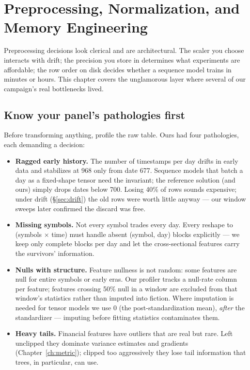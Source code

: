 \chapter[Preprocessing and Memory Engineering]{Preprocessing, Normalization, and Memory Engineering}
\label{ch:preprocessing}

Preprocessing decisions look clerical and are architectural. The scaler you
choose interacts with drift; the precision you store in determines what
experiments are affordable; the row order on disk decides whether a sequence
model trains in minutes or hours. This chapter covers the unglamorous layer
where several of our campaign's real bottlenecks lived.

\section{Know your panel's pathologies first}

Before transforming anything, profile the raw table. Ours had four
pathologies, each demanding a decision:

\begin{itemize}
\item \textbf{Ragged early history.} The number of timestamps per day drifts
  in early data and stabilizes at 968 only from date 677. Sequence models
  that batch a day as a fixed-shape tensor need the invariant; the reference
  solution (and ours) simply drops dates below 700. Losing 40\% of rows
  sounds expensive; under drift (\S\ref{sec:drift}) the old rows were
  worth little anyway --- our window sweeps later confirmed the discard was
  free.
\item \textbf{Missing symbols.} Not every symbol trades every day. Every
  reshape to (symbols $\times$ time) must handle absent (symbol, day)
  blocks explicitly --- we keep only complete blocks per day and let the
  cross-sectional features carry the survivors' information.
\item \textbf{Nulls with structure.} Feature nullness is not random: some
  features are null for entire symbols or early eras. Our profiler tracks
  a null-rate column per feature; features crossing 50\% null in a window
  are excluded from that window's statistics rather than imputed into
  fiction. Where imputation is needed for tensor models we use 0 (the
  post-standardization mean), \emph{after} the standardizer --- imputing
  before fitting statistics contaminates them.
\item \textbf{Heavy tails.} Financial features have outliers that are real
  but rare. Left unclipped they dominate variance estimates and gradients
  (Chapter~\ref{ch:metric}); clipped too aggressively they lose tail
  information that trees, in particular, can use.
\end{itemize}

